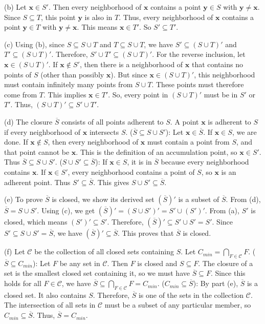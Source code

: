 (b) Let $\mathbf{x} \in S'$. Then every neighborhood of $\mathbf{x}$ contains a point $\mathbf{y} \in S$ with $\mathbf{y} \neq \mathbf{x}$. Since $S \subseteq T$, this point $\mathbf{y}$ is also in $T$. Thus, every neighborhood of $\mathbf{x}$ contains a point $\mathbf{y} \in T$ with $\mathbf{y} \neq \mathbf{x}$. This means $\mathbf{x} \in T'$. So $S' \subseteq T'$.

(c) Using (b), since $S \subseteq S \cup T$ and $T \subseteq S \cup T$, we have $S' \subseteq (S \cup T)'$ and $T' \subseteq (S \cup T)'$. Therefore, $S' \cup T' \subseteq (S \cup T)'$. For the reverse inclusion, let $\mathbf{x} \in (S \cup T)'$. If $\mathbf{x} \notin S'$, then there is a neighborhood of $\mathbf{x}$ that contains no points of $S$ (other than possibly $\mathbf{x}$). But since $\mathbf{x} \in (S \cup T)'$, this neighborhood must contain infinitely many points from $S \cup T$. These points must therefore come from $T$. This implies $\mathbf{x} \in T'$. So, every point in $(S \cup T)'$ must be in $S'$ or $T'$. Thus, $(S \cup T)' \subseteq S' \cup T'$.

(d) The closure $\overline{S}$ consists of all points adherent to $S$. A point $\mathbf{x}$ is adherent to $S$ if every neighborhood of $\mathbf{x}$ intersects $S$.
($\overline{S} \subseteq S \cup S'$): Let $\mathbf{x} \in \overline{S}$. If $\mathbf{x} \in S$, we are done. If $\mathbf{x} \notin S$, then every neighborhood of $\mathbf{x}$ must contain a point from $S$, and that point cannot be $\mathbf{x}$. This is the definition of an accumulation point, so $\mathbf{x} \in S'$. Thus $\overline{S} \subseteq S \cup S'$.
($S \cup S' \subseteq \overline{S}$): If $\mathbf{x} \in S$, it is in $\overline{S}$ because every neighborhood contains $\mathbf{x}$. If $\mathbf{x} \in S'$, every neighborhood contains a point of $S$, so $\mathbf{x}$ is an adherent point. Thus $S' \subseteq \overline{S}$. This gives $S \cup S' \subseteq \overline{S}$.

(e) To prove $\overline{S}$ is closed, we show its derived set $(\overline{S})'$ is a subset of $\overline{S}$. From (d), $\overline{S} = S \cup S'$. Using (c), we get $(\overline{S})' = (S \cup S')' = S' \cup (S')'$. From (a), $S'$ is closed, which means $(S')' \subseteq S'$. Therefore, $(\overline{S})' \subseteq S' \cup S' = S'$. Since $S' \subseteq S \cup S' = \overline{S}$, we have $(\overline{S})' \subseteq \overline{S}$. This proves that $\overline{S}$ is closed.

(f) Let $\mathcal{C}$ be the collection of all closed sets containing $S$. Let $C_{min} = \bigcap_{F \in \mathcal{C}} F$.
($\overline{S} \subseteq C_{min}$): Let $F$ be any set in $\mathcal{C}$. Then $F$ is closed and $S \subseteq F$. The closure of a set is the smallest closed set containing it, so we must have $\overline{S} \subseteq F$. Since this holds for all $F \in \mathcal{C}$, we have $\overline{S} \subseteq \bigcap_{F \in \mathcal{C}} F = C_{min}$.
($C_{min} \subseteq \overline{S}$): By part (e), $\overline{S}$ is a closed set. It also contains $S$. Therefore, $\overline{S}$ is one of the sets in the collection $\mathcal{C}$. The intersection of all sets in $\mathcal{C}$ must be a subset of any particular member, so $C_{min} \subseteq \overline{S}$.
Thus, $\overline{S} = C_{min}$.

